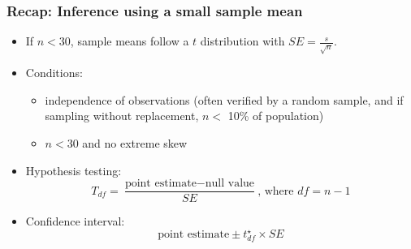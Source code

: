 
\begin{frame}
\frametitle{Recap: Inference using a small sample mean}

\begin{itemize}

\item If $n < 30$, sample means follow a $t$ distribution with $SE = \frac{s}{\sqrt{n}}$.

\pause

\item Conditions: 
\begin{itemize}
\item independence of observations (often verified by a random sample, and if sampling without replacement, $n < $ 10\% of population)
\item $n < 30$ and no extreme skew
\end{itemize}

\pause

\item Hypothesis testing: 
\[ T_{df} = \frac{\text{point estimate} - \text{null value}}{SE}\text{, where }df = n - 1 \]

\pause

\item Confidence interval:
\[ \text{point estimate} \pm t_{df}^\star \times SE \]

\end{itemize}

\pause


\end{frame}

